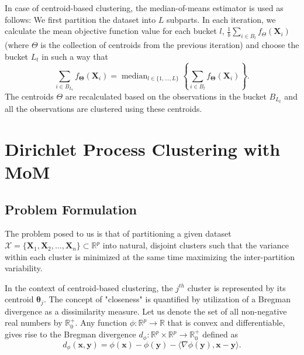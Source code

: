 \documentclass{article}
\newcommand{\bX}{\boldsymbol{X}}
\newcommand{\bTheta}{\boldsymbol{\Theta}}
\begin{document}
In case of centroid-based clustering, the median-of-means estimator is used as follows: We first partition the dataset into $L$ subparts. In each iteration, we calculate the mean objective function value for each bucket $l$, $\frac{1}{b}\sum_{i \in B_{l}}f_{{\Theta}}(\bX_i)$ (where $\Theta$ is the collection of centroids from the previous iteration) and choose the bucket $L_t$ in such a way that
\begin{equation}\label{eq4}
    \sum_{i \in B_{L_t}}f_{{\bTheta}}(\bX_i)=\operatorname{median}_{l \in \{1,\ldots,L\}}\left\{\sum_{i \in B_{l}}f_{{\bTheta}}(\bX_i)\right\}.
\end{equation}
The centroids $\Theta$ are recalculated based on the observations in the bucket $B_{L_t}$ and all the observations are clustered using these centroids.

\section{Dirichlet Process Clustering with MoM}

\subsection{Problem Formulation}
The problem posed to us is that of partitioning a given dataset $\mathcal{X} = \{\bX_1, \bX_2, \ldots, \bX_n\}\subset \mathbb{R}^p$ into natural, disjoint clusters such that the variance within each cluster is minimized at the same time maximizing the inter-partition variability. 


In the context of centroid-based clustering, the $j^{th}$ cluster is represented by its centroid $\boldsymbol{\theta}_j$. The concept of "closeness" is quantified by utilization of a Bregman divergence \cite{BREGMAN1967200} as a dissimilarity measure. Let us denote the set of all non-negative real numbers by $\mathbb{R}^{+}_0$. Any function $\phi: \mathbb{R}^p \rightarrow \mathbb{R}$ that is convex and differentiable, gives rise to the Bregman divergence $d_\phi: \mathbb{R}^p \times \mathbb{R}^p \rightarrow \mathbb{R}^{+}_0$ defined as
\begin{equation}
    d_\phi(\boldsymbol{x}, \boldsymbol{y})=\phi(\boldsymbol{x})-\phi(\boldsymbol{y})-\langle\nabla \phi(\boldsymbol{y}), \boldsymbol{x}-\boldsymbol{y}\rangle.
\end{equation}
\end{document}
